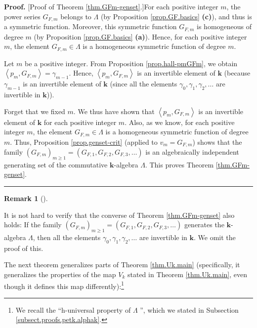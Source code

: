 \documentclass[numbers=enddot,12pt,final,onecolumn,notitlepage]{scrartcl}%
\theoremstyle{definition}
\newtheorem{remk}[theo]{Remark}
\newenvironment{remark}[1][]
{\begin{remk}[#1]\begin{leftbar}}
{\end{leftbar}\end{remk}}
\newenvironment{proof}[1][Proof]{\noindent\textbf{#1.} }{\ \rule{0.5em}{0.5em}}
\newenvironment{verlong}{}{}
\begin{document}
\begin{verlong}
\begin{proof}
[Proof of Theorem \ref{thm.GFm-genset}.]For each positive integer $m$, the
power series $G_{F,m}$ belongs to $\Lambda$ (by Proposition
\ref{prop.GF.basics} \textbf{(c)}), and thus is a symmetric function.
Moreover, this symmetric function $G_{F,m}$ is homogeneous of degree $m$ (by
Proposition \ref{prop.GF.basics} \textbf{(a)}). Hence, for each positive
integer $m$, the element $G_{F,m}\in\Lambda$ is a homogeneous symmetric
function of degree $m$.

Let $m$ be a positive integer. From Proposition \ref{prop.hall-pmGFm}, we
obtain $\left\langle p_{m},G_{F,m}\right\rangle =\gamma_{m-1}$. Hence,
$\left\langle p_{m},G_{F,m}\right\rangle $ is an invertible element of
$\mathbf{k}$ (because $\gamma_{m-1}$ is an invertible element of $\mathbf{k}$
(since all the elements $\gamma_{0},\gamma_{1},\gamma_{2},\ldots$ are
invertible in $\mathbf{k}$)).

Forget that we fixed $m$. We thus have shown that $\left\langle p_{m}%
,G_{F,m}\right\rangle $ is an invertible element of $\mathbf{k}$ for each
positive integer $m$. Also, as we know, for each positive integer $m$, the
element $G_{F,m}\in\Lambda$ is a homogeneous symmetric function of degree $m$.
Thus, Proposition \ref{prop.genset-crit} (applied to $v_{m}=G_{F,m}$) shows
that the family $\left(  G_{F,m}\right)  _{m\geq1}=\left(  G_{F,1}%
,G_{F,2},G_{F,3},\ldots\right)  $ is an algebraically independent generating
set of the commutative $\mathbf{k}$-algebra $\Lambda$. This proves Theorem
\ref{thm.GFm-genset}.
\end{proof}
\end{verlong}

\begin{remark}
It is not hard to verify that the converse of Theorem \ref{thm.GFm-genset}
also holds: If the family $\left(  G_{F,m}\right)  _{m\geq1}=\left(
G_{F,1},G_{F,2},G_{F,3},\ldots\right)  $ generates the $\mathbf{k}$-algebra
$\Lambda$, then all the elements $\gamma_{0},\gamma_{1},\gamma_{2},\ldots$ are
invertible in $\mathbf{k}$. We omit the proof of this.
\end{remark}

The next theorem generalizes parts of Theorem \ref{thm.Uk.main} (specifically,
it generalizes the properties of the map $V_{k}$ stated in Theorem
\ref{thm.Uk.main}, even though it defines this map differently):\footnote{We
recall the \textquotedblleft h-universal property of $\Lambda$%
\textquotedblright, which we stated in Subsection
\ref{subsect.proofs.petk.alphak}.}
\end{document}
